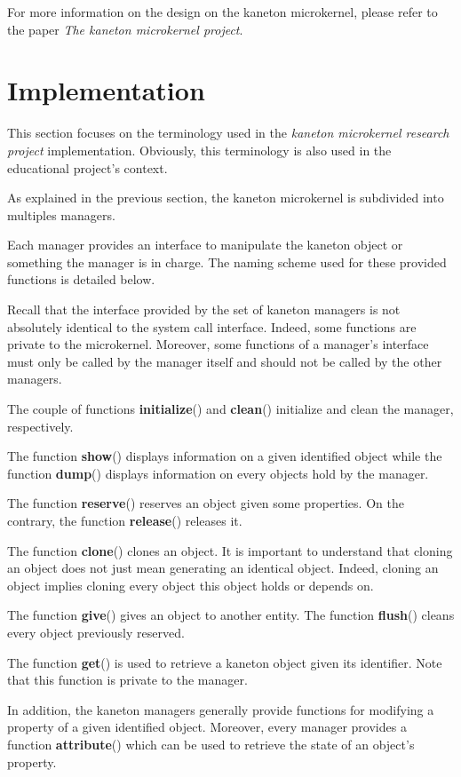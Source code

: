 For more information on the design on the kaneton microkernel, please
refer to the paper \textit{The kaneton microkernel project}.

%
%

\section{Implementation}

This section focuses on the terminology used in the \textit{kaneton microkernel
research project} implementation. Obviously, this terminology is also used
in the educational project's context.

As explained in the previous section, the kaneton microkernel is subdivided
into multiples managers.

Each manager provides an interface to manipulate the kaneton object or
something the manager is in charge. The naming scheme used for these provided
functions is detailed below.

Recall that the interface provided by the set of kaneton managers is not
absolutely identical to the system call interface. Indeed, some functions
are private to the microkernel. Moreover, some functions of a manager's
interface must only be called by the manager itself and should not be called
by the other managers.

The couple of functions \textbf{initialize}() and \textbf{clean}() initialize
and clean the manager, respectively.

The function \textbf{show}() displays information on a given identified object
while the function \textbf{dump}() displays information on every objects
hold by the manager.

The function \textbf{reserve}() reserves an object given some properties. On
the contrary, the function \textbf{release}() releases it.

The function \textbf{clone}() clones an object. It is important to understand
that cloning an object does not just mean generating an identical object.
Indeed, cloning an object implies cloning every object this object holds or
depends on.

The function \textbf{give}() gives an object to another entity. The function
\textbf{flush}() cleans every object previously reserved.

The function \textbf{get}() is used to retrieve a kaneton object given its
identifier. Note that this function is private to the manager.

In addition, the kaneton managers generally provide functions for modifying
a property of a given identified object. Moreover, every manager provides
a function \textbf{attribute}() which can be used to retrieve the state
of an object's property.
